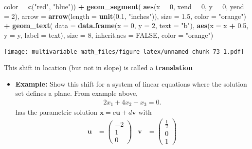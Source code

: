 \documentclass[
]{book}
\newenvironment{Shaded}{\begin{snugshade}}{\end{snugshade}}
\newcommand{\DataTypeTok}[1]{\textcolor[rgb]{0.13,0.29,0.53}{#1}}
\newcommand{\DecValTok}[1]{\textcolor[rgb]{0.00,0.00,0.81}{#1}}
\newcommand{\FloatTok}[1]{\textcolor[rgb]{0.00,0.00,0.81}{#1}}
\newcommand{\KeywordTok}[1]{\textcolor[rgb]{0.13,0.29,0.53}{\textbf{#1}}}
\newcommand{\NormalTok}[1]{#1}
\newcommand{\OperatorTok}[1]{\textcolor[rgb]{0.81,0.36,0.00}{\textbf{#1}}}
\newcommand{\OtherTok}[1]{\textcolor[rgb]{0.56,0.35,0.01}{#1}}
\newcommand{\StringTok}[1]{\textcolor[rgb]{0.31,0.60,0.02}{#1}}
\providecommand{\tightlist}{%
  \setlength{\itemsep}{0pt}\setlength{\parskip}{0pt}}
\theoremstyle{definition}
\theoremstyle{definition}
\theoremstyle{definition}
\theoremstyle{definition}
\theoremstyle{remark}
\begin{document}
\begin{Shaded}
\begin{Highlighting}[]
        \DataTypeTok{color =} \KeywordTok{c}\NormalTok{(}\StringTok{"red"}\NormalTok{, }\StringTok{"blue"}\NormalTok{)) }\OperatorTok{+}
\StringTok{    }\KeywordTok{geom_segment}\NormalTok{(}
        \KeywordTok{aes}\NormalTok{(}\DataTypeTok{x =} \DecValTok{0}\NormalTok{, }\DataTypeTok{xend =} \DecValTok{0}\NormalTok{, }\DataTypeTok{y =} \DecValTok{0}\NormalTok{, }\DataTypeTok{yend =} \DecValTok{2}\NormalTok{),}
        \DataTypeTok{arrow =} \KeywordTok{arrow}\NormalTok{(}\DataTypeTok{length =} \KeywordTok{unit}\NormalTok{(}\FloatTok{0.1}\NormalTok{, }\StringTok{"inches"}\NormalTok{)), }
        \DataTypeTok{size =} \FloatTok{1.5}\NormalTok{, }\DataTypeTok{color =} \StringTok{"orange"}\NormalTok{) }\OperatorTok{+}
\StringTok{    }\KeywordTok{geom_text}\NormalTok{(}
        \DataTypeTok{data =} \KeywordTok{data.frame}\NormalTok{(}\DataTypeTok{x =} \DecValTok{0}\NormalTok{, }\DataTypeTok{y =} \DecValTok{2}\NormalTok{, }\DataTypeTok{text =} \StringTok{"b"}\NormalTok{),}
        \KeywordTok{aes}\NormalTok{(}\DataTypeTok{x =}\NormalTok{ x }\OperatorTok{+}\StringTok{ }\FloatTok{0.5}\NormalTok{, }\DataTypeTok{y =}\NormalTok{ y, }\DataTypeTok{label =}\NormalTok{ text), }
        \DataTypeTok{size =} \DecValTok{8}\NormalTok{, }\DataTypeTok{inherit.aes =} \OtherTok{FALSE}\NormalTok{,}
        \DataTypeTok{color =} \StringTok{"orange"}\NormalTok{) }
\end{Highlighting}
\end{Shaded}

\texttt{[image: multivariable-math\_files/figure-latex/unnamed-chunk-73-1.pdf]}

This shift in location (but not in slope) is called a \textbf{translation}

\begin{itemize}
\tightlist
\item
  \textbf{Example:} Show this shift for a system of linear equations where the solution set defines a plane. From example above,
  \[
  \begin{aligned}
  2x_1 + 4 x_2 - x_3 = 0.
  \end{aligned}
  \]
  has the parametric solution \(\mathbf{x} = c \mathbf{u} + d \mathbf{v}\) with
  \[
  \begin{aligned}
  \mathbf{u} & = \begin{pmatrix} -2 \\ 1 \\ 0 \end{pmatrix} &
  \mathbf{v} & = \begin{pmatrix} \frac{1}{2} \\ 0 \\ 1 \end{pmatrix}
  \end{aligned}
  \]
\end{itemize}
\end{document}
